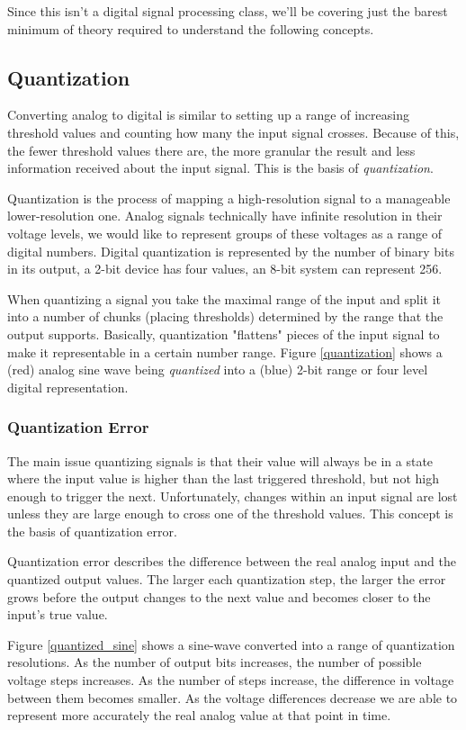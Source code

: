 \documentclass[11pt,fleqn]{book} %
\begin{document}
Since this isn't a digital signal processing class, we'll be covering just the barest minimum of theory required to understand the following concepts.

\subsection{Quantization}
Converting analog to digital is similar to setting up a range of increasing threshold values and counting how many the input signal crosses. Because of this, the fewer threshold values there are, the more granular the result and less information received about the input signal. This is the basis of \textit{quantization}.

Quantization is the process of mapping a high-resolution signal to a manageable lower-resolution one. Analog signals technically have infinite resolution in their voltage levels, we would like to represent groups of these voltages as a range of digital numbers. Digital quantization is represented by the number of binary bits in its output, a 2-bit device has four values, an 8-bit system can represent 256. 

When quantizing a signal you take the maximal range of the input and split it into a number of chunks (placing thresholds) determined by the range that the output supports. Basically, quantization "flattens" pieces of the input signal to make it representable in a certain number range. Figure \ref{quantization} shows a (red) analog sine wave being \textit{quantized} into a (blue) 2-bit range or four level digital representation.  


\subsubsection{Quantization Error}
The main issue quantizing signals is that their value will always be in a state where the input value is higher than the last triggered threshold, but not high enough to trigger the next. Unfortunately, changes within an input signal are lost unless they are large enough to cross one of the threshold values. This concept is the basis of quantization error. 

Quantization error describes the difference between the real analog input and the quantized output values. The larger each quantization step, the larger the error grows before the output changes to the next value and becomes closer to the input's true value. 

Figure \ref{quantized_sine} shows a sine-wave converted into a range of quantization resolutions. As the number of output bits increases, the number of possible voltage steps increases. As the number of steps increase, the difference in voltage between them becomes smaller. As the voltage differences decrease we are able to represent more accurately the real analog value at that point in time.
\end{document}
